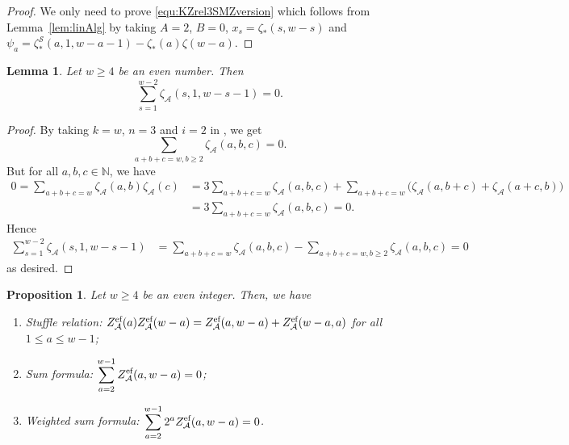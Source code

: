 \documentclass{article}
\newcommand{\Sy}{{\mathcal S}}
\newcommand{\calA}{\mathcal{A}}
\newcommand{\eff}{\text{\rm{ef}}}
\newcommand{\N}{\mathbb{N}}
\theoremstyle{plain}
\newtheorem{lem}[thm]{Lemma}
\newtheorem{prop}[thm]{Proposition}
\theoremstyle{definition}
\begin{document}
\begin{proof}
We only need to prove \eqref{equ:KZrel3SMZversion} which follows from Lemma~\ref{lem:linAlg} by taking $A=2$, $B=0$,
$x_s= \zeta_*(s,w-s)$  and $\psi_a=\zeta_\ast^\Sy(a,1,w-a-1)-\zeta_*(a)\zeta(w-a)$.
\end{proof}

\begin{lem}\label{lem:triple=0}
Let $w\ge 4$ be an even number. Then
\begin{equation*}
\sum_{s=1}^{w-2} \zeta_\calA(s,1,w-s-1)=0.
\end{equation*}
\end{lem}

\begin{proof}
By taking $k=w$, $n=3$ and $i=2$ in \cite[Theorem 1.4]{SaitoWa2013b}, we get
\begin{equation*}
\sum_{a+b+c=w,b\ge 2} \zeta_\calA(a,b,c)=0.
\end{equation*}
But for all $a,b,c\in\N$, we have
\begin{align*}
0=\sum_{a+b+c=w}  \zeta_\calA(a,b)  \zeta_\calA(c) & =3 \sum_{a+b+c=w}  \zeta_\calA(a,b,c)
 + \sum_{a+b+c=w}\Big( \zeta_\calA(a,b+c) +\zeta_\calA(a+c,b) \Big)\\
 & =3 \sum_{a+b+c=w}  \zeta_\calA(a,b,c)=0.
\end{align*}
Hence
\begin{align*}
\sum_{s=1}^{w-2} \zeta_\calA(s,1,w-s-1)
&=\sum_{a+b+c=w}  \zeta_\calA(a,b,c)-\sum_{a+b+c=w,b\ge 2} \zeta_\calA(a,b,c)=0
\end{align*}
as desired.
\end{proof}

\begin{prop}\label{prop:doubleZetaProperties}
Let $w\ge 4$ be an even integer. Then,  we have
\begin{enumerate}
  \item[\upshape{(i)}] Stuffle relation: $Z_\calA^\eff(a)Z_\calA^\eff(w-a)= Z_\calA^\eff(a,w-a)+ Z_\calA^\eff(w-a,a)$ for all $1\le a\le w-1$;

  \item[\upshape{(ii)}] Sum formula: $\displaystyle \sum_{a=2}^{w-1} Z_\calA^\eff(a,w-a)=0$;

  \item[\upshape{(iii)}] Weighted sum formula: $\displaystyle \sum_{a=2}^{w-1} 2^a Z_\calA^\eff(a,w-a)=0$.
\end{enumerate}
\end{prop}
\end{document}
